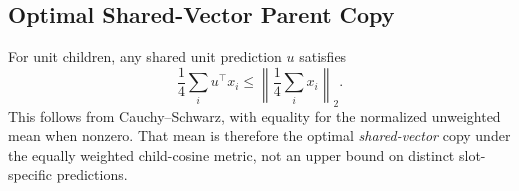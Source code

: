 \documentclass[10pt]{article}
\begin{document}
\subsection{Optimal Shared-Vector Parent Copy}
\label{app:parent-copy-bound}

For unit children, any shared unit prediction \(u\) satisfies
\[
 \frac14\sum_i u^\top x_i
 \leq \left\lVert\frac14\sum_i x_i\right\rVert_2.
\]
This follows from Cauchy--Schwarz, with equality for the normalized
unweighted mean when nonzero. That mean is therefore the optimal
\emph{shared-vector} copy under the equally weighted child-cosine metric,
not an upper bound on distinct slot-specific predictions.
\end{document}
